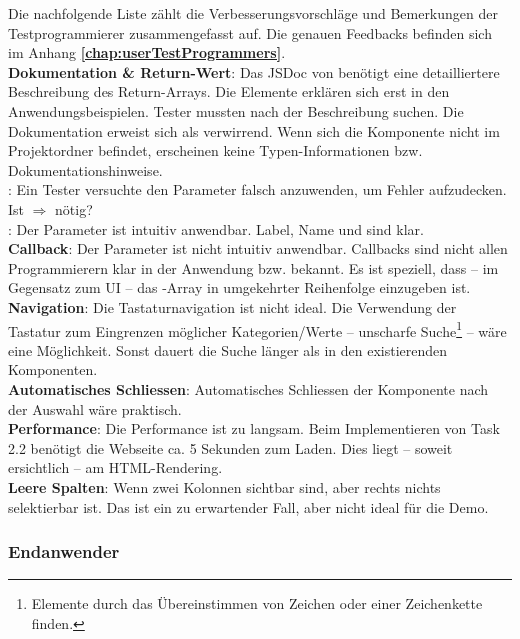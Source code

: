 Die nachfolgende Liste zählt die Verbesserungsvorschläge und Bemerkungen der Testprogrammierer zusammengefasst auf. 
Die genauen Feedbacks befinden sich im Anhang \textbf{\ref{chap:userTestProgrammers}}. 
 \\
\textbf{Dokumentation \& Return-Wert}: 
Das JSDoc von  benötigt eine detailliertere Beschreibung des Return-Arrays. 
Die Elemente erklären sich erst in den Anwendungsbeispielen. 
Tester mussten nach der Beschreibung suchen. 
Die Dokumentation erweist sich als verwirrend. 
Wenn sich die Komponente nicht im Projektordner befindet, erscheinen keine Typen-Informationen bzw. Dokumentationshinweise. 
\\
: 
Ein Tester versuchte den Parameter falsch anzuwenden, um Fehler aufzudecken. 
Ist  $\Rightarrow$  nötig? 
\\
: 
Der Parameter ist intuitiv anwendbar. 
Label, Name und  sind klar. 
\\
\textbf{Callback}: 
Der Parameter ist nicht intuitiv anwendbar. 
Callbacks sind nicht allen Programmierern klar in der Anwendung bzw. bekannt. 
Es ist speziell, dass – im Gegensatz zum UI – das -Array in umgekehrter Reihenfolge einzugeben ist. 
\\
\textbf{Navigation}: 
Die Tastaturnavigation ist nicht ideal. 
Die Verwendung der Tastatur zum Eingrenzen möglicher Kategorien/Werte – unscharfe Suche\footnote{
    Elemente durch das Übereinstimmen von Zeichen oder einer Zeichenkette finden.
} – wäre eine Möglichkeit. 
Sonst dauert die Suche länger als in den existierenden Komponenten. 
\\
\textbf{Automatisches Schliessen}: 
Automatisches Schliessen der Komponente nach der Auswahl wäre praktisch. 
\\
\textbf{Performance}: 
Die Performance ist zu langsam. 
Beim Implementieren von Task 2.2 benötigt die Webseite ca. 5 Sekunden zum Laden. 
Dies liegt – soweit ersichtlich – am HTML-Rendering. 
\\
\textbf{Leere Spalten}: 
Wenn zwei Kolonnen sichtbar sind, aber rechts nichts selektierbar ist. 
Das ist ein zu erwartender Fall, aber nicht ideal für die Demo. 


\subsubsection{\color{dblue} Endanwender}
\label{sec:userTestsEnduser}

